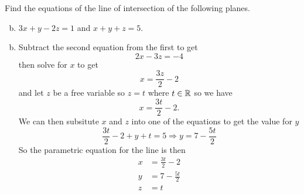 \documentclass[../main.tex]{subfiles}
\begin{document}
Find the equations of the line of intersection of the following planes.
\begin{enumerate}[a)]
	\setcounter{enumi}{1}
	\item $3x + y - 2z = 1$ and $x + y + z = 5$.
\end{enumerate}

\solution
\begin{enumerate}[a)]
	\setcounter{enumi}{1}
	\item Subtract the second equation from the first to get
	\[ 2x-3z = -4 \]
	then solve for $x$ to get
	\[ x = \frac{3z}{2}-2 \]
	and let $z$ be a free variable so $z = t$ where $t \in \operatorname{\mathbb{R}}$ so we have
	\[ x = \frac{3t}{2}-2. \]
	We can then subsitute $x$ and $z$ into one of the equations to get the value for $y$
	\[
		\frac{3t}{2}-2 + y + t = 5
		\Rightarrow
		y = 7-\frac{5t}{2}
	\]
	So the parametric equation for the line is then
	\begin{align*}
		x &= \frac{3t}{2}-2\\
		y &= 7-\frac{5t}{2}\\
		z &= t
	\end{align*}
\end{enumerate}
\end{document}

